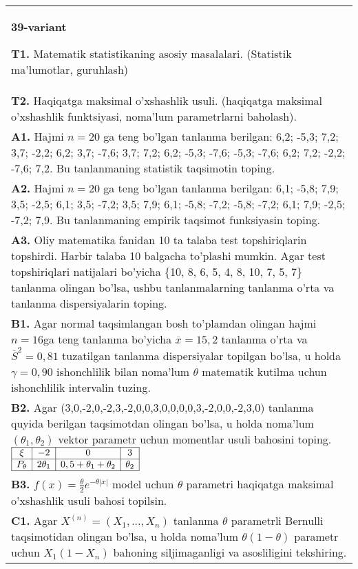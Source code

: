\documentclass{article}
\begin{document}
\begin{tabular}{m{17cm}}
\textbf{39-variant}
\newline

\textbf{T1.} Matematik statistikaning asosiy masalalari. (Statistik ma'lumotlar, guruhlash)
\\
\textbf{T2.} 
Haqiqatga maksimal o'xshashlik usuli. (haqiqatga maksimal o'xshashlik funktsiyasi, noma'lum parametrlarni baholash).
\\
\textbf{A1.} 
Hajmi \(n = 20\) ga teng bo'lgan tanlanma berilgan: 6,2; -5,3; 7,2; 3,7; -2,2; 6,2; 3,7; -7,6; 3,7; 7,2; 6,2; -5,3; -7,6; -5,3; -7,6; 6,2; 7,2; -2,2; -7,6; 7,2. Bu tanlanmaning statistik taqsimotin toping.
\\
\textbf{A2.} 
Hajmi \(n = 20\) ga teng bo'lgan tanlanma berilgan: 6,1; -5,8; 7,9; 3,5; -2,5; 6,1; 3,5; -7,2; 3,5; 7,9; 6,1; -5,8; -7,2; -5,8; -7,2; 6,1; 7,9; -2,5; -7,2; 7,9. Bu tanlanmaning empirik taqsimot funksiyasin toping.
\\
\textbf{A3.} 
Oliy matematika fanidan 10 ta talaba test topshiriqlarin topshirdi. Harbir talaba 10 balgacha to'plashi mumkin. Agar test topshiriqlari natijalari bo'yicha \{10, 8, 6, 5, 4, 8, 10, 7, 5, 7\} tanlanma olingan bo'lsa, ushbu tanlanmalarning tanlanma o'rta va tanlanma dispersiyalarin toping.
\\
\textbf{B1.} 
Agar normal taqsimlangan bosh to'plamdan olingan hajmi \(n = 16\)ga teng tanlanma bo'yicha \(\overline{x} = 15,2\) tanlanma o'rta va \({\overline{S}}^{2} = 0,81\) tuzatilgan tanlanma dispersiyalar topilgan bo'lsa, u holda \(\gamma = 0,90\) ishonchlilik bilan noma'lum \(\theta\) matematik kutilma uchun ishonchlilik intervalin tuzing.
\\
\textbf{B2.} 
Agar (3,0,-2,0,-2,3,-2,0,0,3,0,0,0,0,3,-2,0,0,-2,3,0) tanlanma quyida berilgan taqsimotdan olingan bo'lsa, u holda noma'lum \(\left( \theta_{1},\theta_{2} \right)\) vektor parametr uchun momentlar usuli bahosini toping.
$\begin{array}{|c|c|c|c|}
    \hline
    \xi & - 2 & 0 & 3 \\
    \hline
    P_{\theta} & 2\theta_{1} & 0,5 + \theta_{1} + \theta_{2} & \theta_{2} \\
    \hline
\end{array}$
\\
\textbf{B3.} 
\(f(x) = \frac{\theta}{2}e^{- \theta|x|}\) model uchun \(\theta\) parametri haqiqatga maksimal o'xshashlik usuli bahosi topilsin.
\\
\textbf{C1.} 
Agar \(X^{(n)} = \left( X_{1},...,X_{n} \right)\) tanlanma \(\theta\) parametrli Bernulli taqsimotidan olingan bo'lsa, u holda noma'lum \(\theta(1 - \theta)\) parametr uchun \(X_{1}\left( 1 - X_{n} \right)\) bahoning siljimaganligi va asosliligini tekshiring.

\end{tabular}
\end{document}
